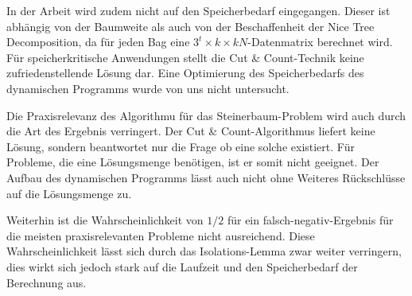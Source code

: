 In der Arbeit \cite{cygan_solving_2011} wird zudem nicht auf den Speicherbedarf eingegangen. 
Dieser ist abhängig von der Baumweite als auch von der Beschaffenheit der Nice Tree Decomposition, da für jeden Bag eine $3^t\times k\times kN$-Datenmatrix berechnet wird. Für speicherkritische Anwendungen stellt die Cut \& Count-Technik keine zufriedenstellende Lösung dar. Eine Optimierung des Speicherbedarfs des dynamischen Programms wurde von uns nicht untersucht.

Die Praxisrelevanz des Algorithmu für das Steinerbaum-Problem wird auch durch die Art des Ergebnis verringert. Der Cut \& Count-Algorithmus liefert keine Lösung, sondern beantwortet nur die Frage ob eine solche existiert. Für Probleme, die eine Lösungsmenge benötigen, ist er somit nicht geeignet. Der Aufbau des dynamischen Programms lässt auch nicht ohne Weiteres Rückschlüsse auf die Lösungsmenge zu.

Weiterhin ist die Wahrscheinlichkeit von $1/2$ für ein falsch-negativ-Ergebnis für die meisten praxisrelevanten Probleme nicht ausreichend. Diese Wahrscheinlichkeit lässt sich durch das Isolations-Lemma zwar weiter verringern, dies wirkt sich jedoch stark auf die Laufzeit und den Speicherbedarf der Berechnung aus.
